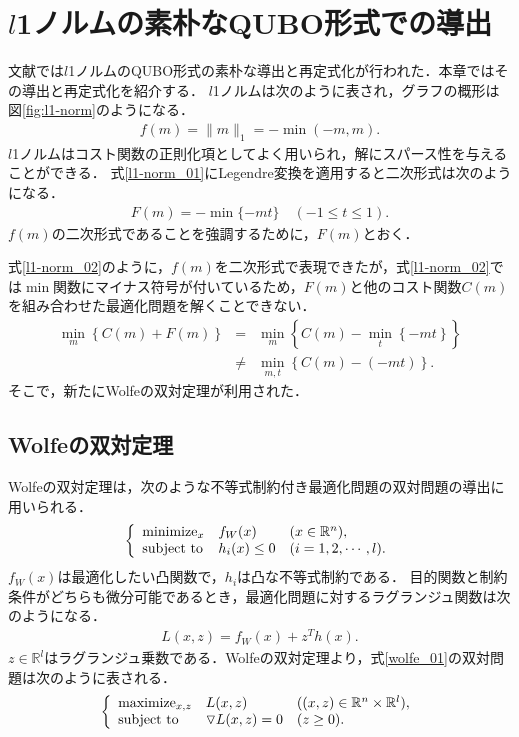 \documentclass[technicalreport]{ieicej}
\begin{document}
\section{$l$1ノルムの素朴なQUBO形式での導出}
文献\cite{l1-norm}では$l$1ノルムのQUBO形式の素朴な導出と再定式化が行われた．本章ではその導出と再定式化を紹介する．
$l$1ノルムは次のように表され，グラフの概形は図\ref{fig:l1-norm}のようになる．
\begin{eqnarray}
  f(m) = \|m\|_{1} = -\min{(-m,m)}. \label{l1-norm_01}
\end{eqnarray}
$l$1ノルムはコスト関数の正則化項としてよく用いられ，解にスパース性を与えることができる．
式\ref{l1-norm_01}にLegendre変換を適用すると二次形式は次のようになる．
\begin{eqnarray}
  F(m) = -\min{\{-mt\}} \quad (-1\leq t\leq 1). \label{l1-norm_02}
\end{eqnarray}
$f(m)$の二次形式であることを強調するために，$F(m)$とおく．

式\ref{l1-norm_02}のように，$f(m)$を二次形式で表現できたが，式\ref{l1-norm_02}では$\min$関数にマイナス符号が付いているため，$F(m)$と他のコスト関数$C(m)$を組み合わせた最適化問題を解くことできない．
\begin{eqnarray}
  \min_{m}{\left\{C(m)+F(m)\right\}} &=& \min_{m}{\left\{C(m)-\min_{t}{\left\{-mt\right\}}\right\}} \nonumber \\
  & \neq & \min_{m,t}{\left\{C(m)-(-mt)\right\}}.
\end{eqnarray}
そこで，新たにWolfeの双対定理が利用された．

\subsection{Wolfeの双対定理} \label{sec:wolfe}
Wolfeの双対定理は，次のような不等式制約付き最適化問題の双対問題の導出に用いられる．
\begin{equation}
  \left\{
  \begin{array}{lll}
    $minimize$_{x} & f_{W}(x) & (x\in\mathbb{R}^{n}), \\
    $subject to$ & h_{i}(x)\leq 0 & (i=1,2,\cdots,l). \label{wolfe_01}
  \end{array}
  \right.
\end{equation}
$f_{W}(x)$は最適化したい凸関数で，$h_{i}$は凸な不等式制約である．
目的関数と制約条件がどちらも微分可能であるとき，最適化問題に対するラグランジュ関数は次のようになる．
\begin{eqnarray}
  L(x,z) = f_{W}(x)+z^{T}h(x).
\end{eqnarray}
$z\in\mathbb{R}^{l}$はラグランジュ乗数である．Wolfeの双対定理より，式\ref{wolfe_01}の双対問題は次のように表される．
\begin{equation}
  \left\{
  \begin{array}{lll}
    $maximize$_{x,z} & L(x,z) & ((x,z)\in\mathbb{R}^{n}\times\mathbb{R}^{l}), \\
    $subject to$ & \triangledown L(x,z)=0 & (z\geq 0). \label{wolfe_02}
  \end{array}
  \right.
\end{equation}
\end{document}
